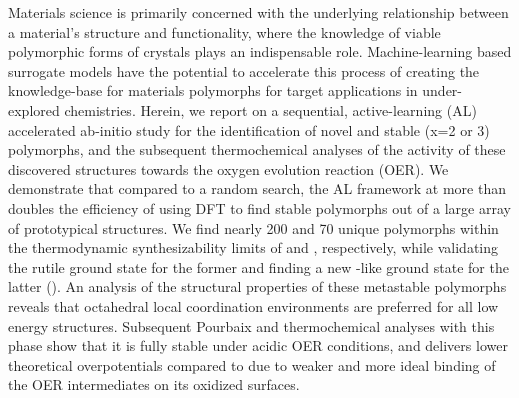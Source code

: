 





%
Materials science is primarily concerned with the underlying relationship between a material's structure and functionality,
where the knowledge of viable polymorphic forms of crystals plays an indispensable role.
%
Machine-learning based surrogate models have the potential to accelerate this process of creating the knowledge-base for materials polymorphs for target applications in under-explored chemistries.
%
Herein, we report on a sequential, active-learning (AL) accelerated ab-initio study for the identification of novel and stable \IrOx (x=2 or 3) polymorphs,
and the subsequent thermochemical analyses of the activity of these discovered structures towards the oxygen evolution reaction (OER).
%
We demonstrate that compared to a random search,
the AL framework at more than doubles the efficiency of using DFT to find stable polymorphs out of a large array of prototypical structures.
%
We find nearly \num{200} and \num{70} unique polymorphs within the thermodynamic synthesizability limits of \IrOtwo and \IrOthree, respectively,
while validating the rutile ground state for the former and finding a new -like ground state for the latter (\aIrOthree).
%
An analysis of the structural properties of these metastable polymorphs reveals that octahedral local coordination environments are preferred for all low energy structures.
%
Subsequent Pourbaix and thermochemical analyses with this \aIrOthree phase show that it is fully stable under acidic OER conditions,
and delivers lower theoretical overpotentials compared to \rIrOtwo due to weaker and more ideal binding of the OER intermediates on its oxidized surfaces.
